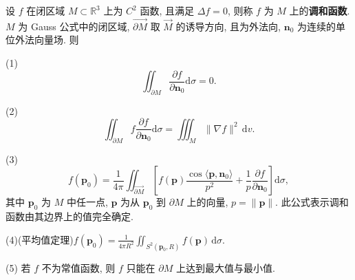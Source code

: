\begin{theorem}\label{thm:11.6.3}
设 $f$ 在闭区域 $M\subset\mathbb{R}^{3}$ 上为 $C^{2}$ 函数, 且满足 $\Delta f=0$, 则称 $f$ 为 $M$ 上的\textbf{调和函数}. $M$ 为 Gauss 公式中的闭区域, $\overrightarrow{\partial M}$ 取 $\overrightarrow{M}$ 的诱导方向, 且为外法向, $\boldsymbol{n}_{0}$ 为连续的单位外法向量场. 则

(1)
\[
\iint_{\partial M}\frac{\partial f}{\partial\boldsymbol{n}_{0}}\mathrm{d}\sigma=0.
\]

(2)
\[
\iint_{\partial M}f\frac{\partial f}{\partial\boldsymbol{n}_{0}}\mathrm{d}\sigma=\iiint_{M}\|\nabla f\|^{2}\,\mathrm{d}v.
\]

(3)
\[
f(\boldsymbol{p}_{0})=\frac{1}{4\pi}\iint_{\overrightarrow{\partial M}}\left[f(\boldsymbol{p})\frac{\cos\langle\boldsymbol{p},\boldsymbol{n}_{0}\rangle}{p^{2}}+\frac{1}{p}\frac{\partial f}{\partial\boldsymbol{n}_{0}}\right]\mathrm{d}\sigma,
\]
其中 $\boldsymbol{p}_{0}$ 为 $M$ 中任一点, $\boldsymbol{p}$ 为从 $\boldsymbol{p}_{0}$ 到 $\partial M$ 上的向量, $p=\|\boldsymbol{p}\|$. 此公式表示调和函数由其边界上的值完全确定.

(4)(平均值定理)$\displaystyle f(\boldsymbol{p}_{0})=\frac{1}{4\pi R^{2}}\iint_{S^{2}(\boldsymbol{p}_{0},R)}f(\boldsymbol{p})\,\mathrm{d}\sigma$.

(5) 若 $f$ 不为常值函数, 则 $f$ 只能在 $\partial M$ 上达到最大值与最小值.
\end{theorem}

